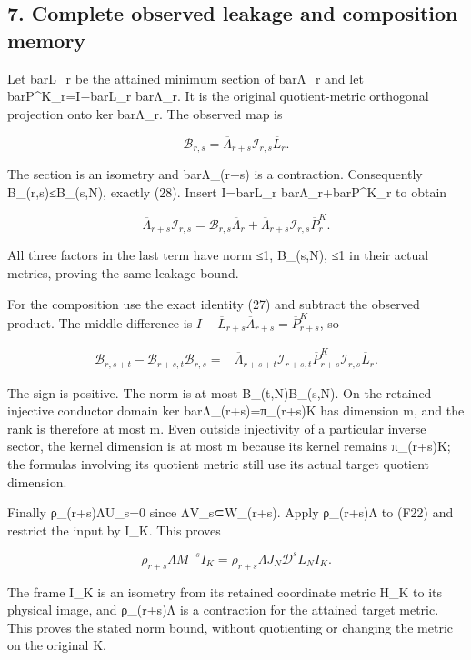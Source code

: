 \subsection{7. Complete observed leakage and composition memory}\label{complete-observed-leakage-and-composition-memory}

Let barL\_r be the attained minimum section of barΛ\_r and let barP\^{}K\_r=I−barL\_r barΛ\_r. It is the original quotient-metric orthogonal projection onto ker barΛ\_r. The observed map is

\[
\mathcal B_{r,s}=\overline\Lambda_{r+s}
\mathcal I_{r,s}\overline L_r.
\]

The section is an isometry and barΛ\_(r+s) is a contraction. Consequently \textbar\textbar B\_(r,s)\textbar\textbar≤B\_(s,N), exactly (28). Insert I=barL\_r barΛ\_r+barP\^{}K\_r to obtain

\[
\overline\Lambda_{r+s}\mathcal I_{r,s}
=\mathcal B_{r,s}\overline\Lambda_r
+\overline\Lambda_{r+s}\mathcal I_{r,s}\overline P^K_r. \tag{F29}
\]

All three factors in the last term have norm ≤1, B\_(s,N), ≤1 in their actual metrics, proving the same leakage bound.

For the composition use the exact identity (27) and subtract the observed product. The middle difference is \(I-\overline L_{r+s}\overline\Lambda_{r+s}=\overline P^K_{r+s}\), so

\[
\begin{aligned}
\mathcal B_{r,s+t}-\mathcal B_{r+s,t}\mathcal B_{r,s}
={}&\overline\Lambda_{r+s+t}\mathcal I_{r+s,t}
\overline P^K_{r+s}\mathcal I_{r,s}\overline L_r.
\end{aligned}\tag{F30}
\]

The sign is positive. The norm is at most B\_(t,N)B\_(s,N). On the retained injective conductor domain ker barΛ\_(r+s)=π\_(r+s)K has dimension m, and the rank is therefore at most m. Even outside injectivity of a particular inverse sector, the kernel dimension is at most m because its kernel remains π\_(r+s)K; the formulas involving its quotient metric still use its actual target quotient dimension.

Finally ρ\_(r+s)ΛU\_s=0 since ΛV\_s⊂W\_(r+s). Apply ρ\_(r+s)Λ to (F22) and restrict the input by I\_K. This proves

\[
\rho_{r+s}\Lambda M^{-s}I_K
=\rho_{r+s}\Lambda J_N\mathscr D^sL_NI_K. \tag{F31}
\]

The frame I\_K is an isometry from its retained coordinate metric H\_K to its physical image, and ρ\_(r+s)Λ is a contraction for the attained target metric. This proves the stated norm bound, without quotienting or changing the metric on the original K.

